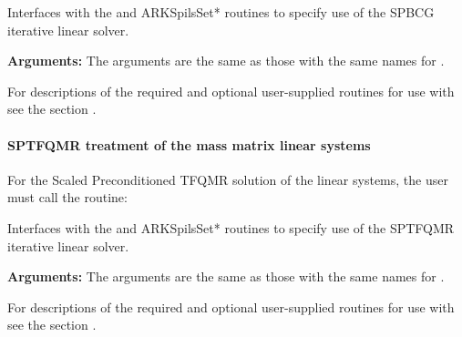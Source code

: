 \documentclass[letterpaper,10pt,english]{sphinxmanual}
\begin{document}
\begin{fulllineitems}
\label{f_interface/Usage:f/_/FARKMASSSPBCG}
Interfaces with the {\hyperref[c_interface/User_callable:c.ARKMassSpbcg]{\emph{}}} and
ARKSpilsSet* routines to specify use of the SPBCG iterative
linear solver.

\textbf{Arguments:}  The arguments are the same as those with the
same names for {\hyperref[f_interface/Usage:f/_/FARKMASSSPGMR]{\emph{}}}.

\end{fulllineitems}


For descriptions of the required and optional user-supplied routines
for use with {\hyperref[f_interface/Usage:f/_/FARKMASSSPBCG]{\emph{}}} see the section
{\hyperref[f_interface/Usage:finterface-massspilsusersupplied]{\emph{}}}.


\paragraph{SPTFQMR treatment of the mass matrix linear systems}
\label{f_interface/Usage:sptfqmr-treatment-of-the-mass-matrix-linear-systems}
For the Scaled Preconditioned TFQMR solution of the linear systems,
the user must call the {\hyperref[f_interface/Usage:f/_/FARKMASSSPTFQMR]{\emph{}}} routine:

\begin{fulllineitems}
\label{f_interface/Usage:f/_/FARKMASSSPTFQMR}
Interfaces with the {\hyperref[c_interface/User_callable:c.ARKMassSptfqmr]{\emph{}}} and
ARKSpilsSet* routines to specify use of the SPTFQMR iterative
linear solver.

\textbf{Arguments:}  The arguments are the same as those with the same names
for {\hyperref[f_interface/Usage:f/_/FARKMASSSPGMR]{\emph{}}}.

\end{fulllineitems}


For descriptions of the required and optional user-supplied routines
for use with {\hyperref[f_interface/Usage:f/_/FARKMASSSPTFQMR]{\emph{}}} see the section
{\hyperref[f_interface/Usage:finterface-massspilsusersupplied]{\emph{}}}.
\end{document}
